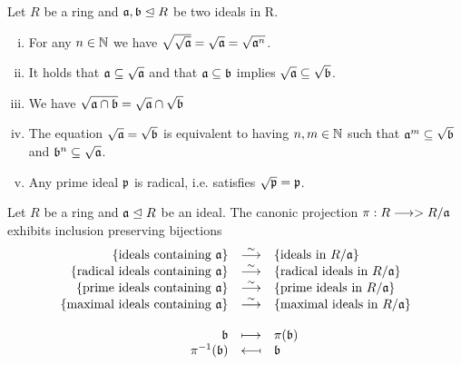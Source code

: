 	\begin{lemma}
		Let $R$ be a ring and $\mathfrak{a},\mathfrak{b} \trianglelefteq R$ be two ideals in R.
		\begin{enumerate}[(i)]
			\item{
				For any $n \in \mathbb{N}$ we have $\sqrt{\sqrt{\mathfrak{a}}} = \sqrt{\mathfrak{a}} = \sqrt{\mathfrak{a}^n}$.
			}
			\item{
				It holds that $\mathfrak{a} \subseteq \sqrt{\mathfrak{a}}$ and that $\mathfrak{a} \subseteq \mathfrak{b}$ implies $\sqrt{\mathfrak{a}} \subseteq \sqrt{\mathfrak{b}}$.
			}
			\item{
				We have $\sqrt{\mathfrak{a} \cap \mathfrak{b}} = \sqrt{\mathfrak{a}} \cap \sqrt{\mathfrak{b}}$
			}
			\item{
				The equation $\sqrt{\mathfrak{a}} = \sqrt{\mathfrak{b}}$ is equivalent to having $n,m \in \mathbb{N}$ such that $\mathfrak{a}^m \subseteq \sqrt{\mathfrak{b}}$ and $\mathfrak{b}^n \subseteq \sqrt{\mathfrak{a}}$.
			}
			\item{
				Any prime ideal $\mathfrak{p}$ is radical, i.e. satisfies $\sqrt{\mathfrak{p}} = \mathfrak{p}$.
			}
		\end{enumerate}
	\end{lemma}

	\begin{theorem}
		Let $R$ be a ring and $\mathfrak{a} \trianglelefteq R$ be an ideal. The canonic projection $\pi: R -->> R/\mathfrak{a}$ exhibits inclusion preserving bijections
		\begin{equation*}
			\begin{array}{rcl}
				\{\text{ideals containing }\ideal{a}\} &\overset{\sim}{\longrightarrow} &\{\text{ideals in } R/\ideal{a}\}\\
				\{\text{radical ideals containing }\ideal{a}\} &\overset{\sim}{\longrightarrow} &\{\text{radical ideals in } R/\ideal{a}\}\\
				\{\text{prime ideals containing }\ideal{a}\} &\overset{\sim}{\longrightarrow} &\{\text{prime ideals in } R/\ideal{a}\}\\
				\{\text{maximal ideals containing }\ideal{a}\} &\overset{\sim}{\longrightarrow} &\{\text{maximal ideals in } R/\ideal{a}\}\\\\
				\ideal{b} &\longmapsto &\pi(\ideal{b})\\
				\pi^{-1}(\ideal{b}) &\reflectbox{$\longmapsto$} &\ideal{b}
			\end{array}
		\end{equation*}
	\end{theorem}

